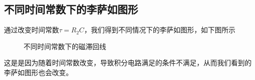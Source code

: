 \documentclass{ctexart}
\begin{document}
	\subsection{不同时间常数下的李萨如图形}
	通过改变时间常数$\tau=R_2C$，我们得到不同情况下的李萨如图形，如下图所示
	\begin{figure}[H]
		\centering
	\end{figure}
	\begin{figure}[H]
		\centering
		\caption{不同时间常数下的磁滞回线}
	\end{figure}
	这是是因为随着时间常数改变，导致积分电路满足的条件不满足，从而我们看到的李萨如图形也会改变。
\end{document}
